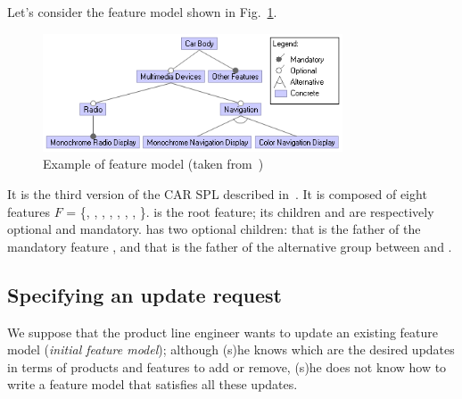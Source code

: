 \begin{tikzborder}{\cite{Gargantini16:validation}}
\begin{tikzborder}{\cite{gargantini_combinatorial_2017}}
\begin{tikzborder}{\cite{garn2019}}
\begin{tikzborder}{\cite{arcaini2019achieving}}
	\begin{exmp}\label{ex:initialFM}
		\bb
		Let's consider the feature model shown in Fig.~\ref{fig:fmExample}.
		\be
		\begin{figure}[!htb]
			\centering
			\includegraphics[height=3.5cm]{car2011}
			\caption{Example of feature model (taken from~\cite{Pleuss2012})}
			\label{fig:fmExample}
		\end{figure}
		\bb
		It is the third version of the CAR SPL described in~\cite{Pleuss2012}. It is composed of eight features $F$ = \{\CarBody, \MultimediaDevices, \OtherFeatures, \Radio, \Navigation, \MonochromeRadioDisplay, \MonochromeNavigationDisplay, \ColorNavigationDisplay{}\}. \CarBody is the root feature; its children \MultimediaDevices and \OtherFeatures are respectively optional and mandatory. \MultimediaDevices has two optional children: \Radio that is the father of the mandatory feature \MonochromeRadioDisplay, and \Navigation that is the father of the alternative group between \MonochromeNavigationDisplay and \ColorNavigationDisplay.\be
	\end{exmp}
	
	\subsection{Specifying an update request}\label{sec:updateRequest}
	
	\bb We suppose that the product line engineer wants to update an existing feature model \initFm ({\it initial feature model}); although (s)he knows which are the desired updates in terms of products and features to add or remove, (s)he does not know how to write a feature model \fmp that satisfies all these updates.
	

\end{tikzborder}
\end{tikzborder}
\end{tikzborder}
\end{tikzborder}
